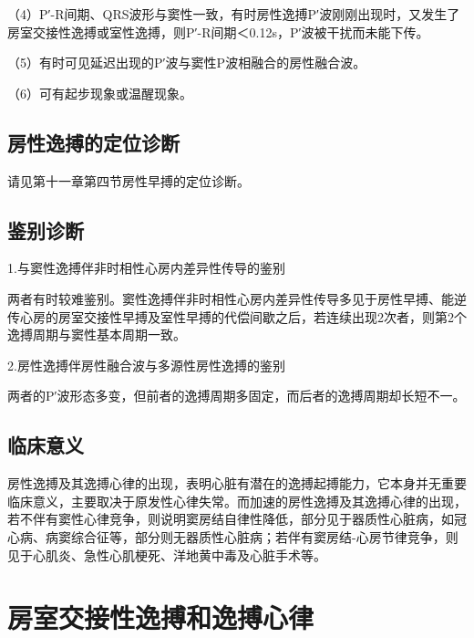 （4）P′-R间期、QRS波形与窦性一致，有时房性逸搏P′波刚刚出现时，又发生了房室交接性逸搏或室性逸搏，则P′-R间期＜0.12s，P′波被干扰而未能下传。

（5）有时可见延迟出现的P′波与窦性P波相融合的房性融合波。

（6）可有起步现象或温醒现象。

\protect\hypertarget{text00019.htmlux5cux23subid178}{}{}

\subsection{房性逸搏的定位诊断}

请见第十一章第四节房性早搏的定位诊断。

\protect\hypertarget{text00019.htmlux5cux23subid179}{}{}

\subsection{鉴别诊断}

1.与窦性逸搏伴非时相性心房内差异性传导的鉴别

两者有时较难鉴别。窦性逸搏伴非时相性心房内差异性传导多见于房性早搏、能逆传心房的房室交接性早搏及室性早搏的代偿间歇之后，若连续出现2次者，则第2个逸搏周期与窦性基本周期一致。

2.房性逸搏伴房性融合波与多源性房性逸搏的鉴别

两者的P′波形态多变，但前者的逸搏周期多固定，而后者的逸搏周期却长短不一。

\protect\hypertarget{text00019.htmlux5cux23subid180}{}{}

\subsection{临床意义}

房性逸搏及其逸搏心律的出现，表明心脏有潜在的逸搏起搏能力，它本身并无重要临床意义，主要取决于原发性心律失常。而加速的房性逸搏及其逸搏心律的出现，若不伴有窦性心律竞争，则说明窦房结自律性降低，部分见于器质性心脏病，如冠心病、病窦综合征等，部分则无器质性心脏病；若伴有窦房结-心房节律竞争，则见于心肌炎、急性心肌梗死、洋地黄中毒及心脏手术等。

\protect\hypertarget{text00019.htmlux5cux23subid181}{}{}

\section{房室交接性逸搏和逸搏心律}


